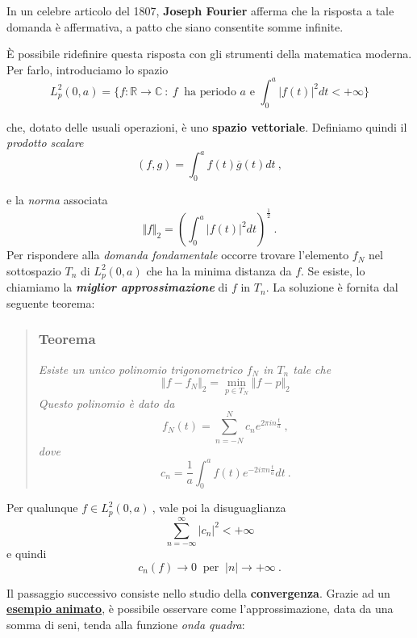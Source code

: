 \documentclass[
]{book}
\begin{document}
In un celebre articolo del 1807, \textbf{Joseph Fourier} afferma che la risposta a tale domanda è affermativa, a patto che siano consentite somme infinite.

È possibile ridefinire questa risposta con gli strumenti della matematica moderna.
Per farlo, introduciamo lo spazio
\[L_{p}^2(0,a)= \{ f:\mathbb{R} \longrightarrow \mathbb{C} \ : \ f \ \text{ ha periodo } a \text{ e } \int_{0}^{a}|f(t)|^2dt < +\infty\bigg\}\]

che, dotato delle usuali operazioni, è uno \textbf{spazio vettoriale}. Definiamo quindi il \emph{prodotto scalare}
\[(f,g) = \int_{0}^{a} f(t) \overline{g}(t)dt \ ,\]

e la \emph{norma} associata
\[ \Vert f \Vert_2 = \left( \int_{0}^{a} |f(t)|^2 dt \right) ^{\textstyle \frac{1}{2}} \ .\]
Per rispondere alla \emph{domanda fondamentale} occorre trovare l'elemento \(f_N\) nel sottospazio \(T_n\) di \(L_{p}^{2}(0,a)\) che ha la minima distanza da \(f\). Se esiste, lo chiamiamo la \emph{\textbf{miglior approssimazione}} di \(f\) in \(T_{n}\).
La soluzione è fornita dal seguente teorema:

\begin{quote}
\hypertarget{teorema}{%
\subsubsection*{Teorema}\label{teorema}}

\emph{Esiste un unico polinomio trigonometrico \(f_N\) in \(T_n\) tale che}
\[ \Vert f - f_N \Vert _{2} = \min_{p \in T_N} \Vert f - p \Vert _{2} \]
\emph{Questo polinomio è dato da}
\begin{equation}
f_{N}(t)=\sum_{n=-N}^{N} c_{n}e^{2\pi in \textstyle \frac {t}{a}} \ ,
\label{eq:polsol}
\end{equation}
\emph{dove}
\begin{equation}
c_n=\frac{1}{a} \int_{0}^{a}f(t)e^{-2 i \pi n \textstyle \frac {t}{a}}dt \ .
\label{eq:coeffsol}
\end{equation}
\end{quote}

Per qualunque \(f \in L_{p}^{2}(0,a) \ \), vale poi la disuguaglianza
\[ \sum_{n=-\infty}^{\infty} |c_n|^{2} < + \infty \]
e quindi
\[ c_n(f) \rightarrow 0 \ \text{ per } \ |n| \rightarrow + \infty \ . \]

Il passaggio successivo consiste nello studio della \textbf{convergenza}.
Grazie ad un \href{https://bradwave.github.io/thesis/\#/esempio-animato}{\textbf{esempio animato}}, è possibile osservare come l'approssimazione, data da una somma di seni, tenda alla funzione \emph{onda quadra}:
\end{document}
